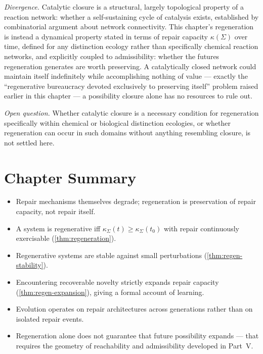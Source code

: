 \documentclass[12pt,twoside,openright]{book}
\newenvironment{chapsummary}{%
  \begin{tcolorbox}[colback=DistBlue!5,colframe=DistBlue,
    title={\faBookOpen\enspace Summary},
    fonttitle=\sffamily\bfseries\color{white},
    attach boxed title to top left={yshift=-2mm,xshift=4mm},
    boxed title style={colback=DistBlue,rounded corners}]
  \begin{itemize}[nosep,leftmargin=*]}{%
  \end{itemize}\end{tcolorbox}}
\begin{document}
\emph{Divergence.} Catalytic closure is a structural, largely
topological property of a reaction network: whether a
self-sustaining cycle of catalysis exists, established by
combinatorial argument about network connectivity. This
chapter's regeneration is instead a dynamical property stated in
terms of repair capacity $\kappa(\Sigma)$ over time, defined for
any distinction ecology rather than specifically chemical
reaction networks, and explicitly coupled to admissibility:
whether the futures regeneration generates are worth preserving.
A catalytically closed network could maintain itself
indefinitely while accomplishing nothing of value --- exactly
the ``regenerative bureaucracy devoted exclusively to preserving
itself'' problem raised earlier in this chapter --- a
possibility closure alone has no resources to rule out.

\emph{Open question.} Whether catalytic closure is a necessary
condition for regeneration specifically within chemical or
biological distinction ecologies, or whether regeneration can
occur in such domains without anything resembling closure, is
not settled here.

\section*{Chapter Summary}
\begin{chapsummary}
  \item Repair mechanisms themselves degrade; regeneration
        is preservation of repair capacity, not repair
        itself.
  \item A system is regenerative iff
        $\kappa_\Sigma(t)\ge\kappa_\Sigma(t_0)$ with repair
        continuously exercisable (\cref{thm:regeneration}).
  \item Regenerative systems are stable against small
        perturbations (\cref{thm:regen-stability}).
  \item Encountering recoverable novelty strictly expands
        repair capacity (\cref{thm:regen-expansion}), giving
        a formal account of learning.
  \item Evolution operates on repair architectures across
        generations rather than on isolated repair events.
  \item Regeneration alone does not guarantee that future
        possibility expands --- that requires the geometry
        of reachability and admissibility developed in
        Part~V.
\end{chapsummary}
\end{document}
